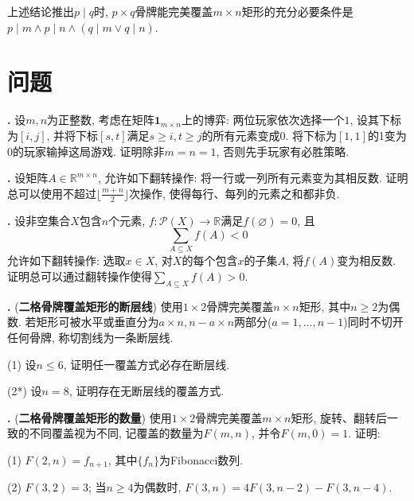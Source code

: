 \par 上述结论推出$p\mid q$时, $p\times q$骨牌能完美覆盖$m\times n$矩形的充分必要条件是$p\mid m \land p\mid n \land (q\mid m \lor q\mid n)$. 

\section*{问题}

\par \textbf{\theprobrec .} \cite{MaP} 设$m,n$为正整数, 考虑在矩阵$\mathbf{1}_{m\times n}$上的博弈: 两位玩家依次选择一个$1$, 设其下标为$[i,j]$, 并将下标$[s,t]$满足$s\ge i, t\ge j$的所有元素变成0. 将下标为$[1,1]$的1变为0的玩家输掉这局游戏. 证明除非$m=n=1$, 否则先手玩家有必胜策略. 

\par \textbf{\theprobrec .} \cite{MaP} 设矩阵$A\in \mathbb{R}^{m\times n}$, 允许如下翻转操作: 将一行或一列所有元素变为其相反数. 证明总可以使用不超过$\lfloor \frac{m+n}{2}\rfloor$次操作, 使得每行、每列的元素之和都非负. 

\par \textbf{\theprobrec .} \cite{MaP} 设非空集合$X$包含$n$个元素, $f:\mathcal{P}(X)\to \mathbb{R}$满足$f(\varnothing)=0$, 且
\begin{equation}
    \sum_{A\subseteq X} f(A)<0
\end{equation}
允许如下翻转操作: 选取$x\in X$, 对$X$的每个包含$x$的子集$A$, 将$f(A)$变为相反数. 证明总可以通过翻转操作使得$\sum_{A\subseteq X} f(A)>0$.

\par \textbf{\theprobrec .} (\textbf{二格骨牌覆盖矩形的断层线}) 使用$1\times 2$骨牌完美覆盖$n\times n$矩形, 其中$n\ge 2$为偶数. 若矩形可被水平或垂直分为$a\times n, n-a \times n$两部分($a=1,\dots, n-1$)同时不切开任何骨牌, 称切割线为一条断层线. 
\par (1) 设$n\le 6$, 证明任一覆盖方式必存在断层线. 
\par (2*) 设$n=8$, 证明存在无断层线的覆盖方式. 

\par \textbf{\theprobrec .} (\textbf{二格骨牌覆盖矩形的数量}) 使用$1\times 2$骨牌完美覆盖$m\times n$矩形, 旋转、翻转后一致的不同覆盖视为不同, 记覆盖的数量为$F(m,n)$, 并令$F(m,0)=1$. 证明:
\par (1) $F(2,n)=f_{n+1}$, 其中$\{f_n\}$为Fibonacci数列. 
\par (2) $F(3,2)=3$; 当$n\ge 4$为偶数时, $F(3,n)=4F(3,n-2)-F(3,n-4)$. 

